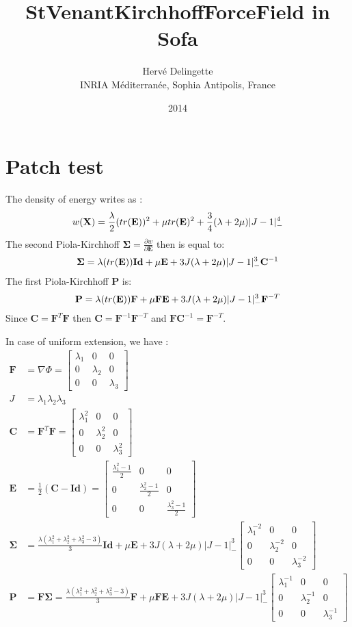 \documentclass[a4paper,11pt]{article}
\title{StVenantKirchhoffForceField in Sofa}
\date{2014}
\author{Herv\'e Delingette\\ {\small INRIA M\'editerran\'ee, Sophia Antipolis, France}}
\newcommand{\pos}{{\mathbf X}}
\newcommand{\strain}{{\mathbf E}}
\newcommand{\rcgd}{{\mathbf C}}
\newcommand{\spk}{{\mathbf \Sigma}}
\newcommand{\fpk}{{\mathbf P}}
\newcommand{\defGrad}{{\mathbf F}}
\newcommand{\identity}{\mathbf{Id}}
\begin{document}
 
\maketitle

\section{Patch test}

The density of energy writes as :
\[
 w(\pos)=\frac{\lambda}{2} (\trace \strain)^2 + \mu \trace \strain^2 +\frac{3}{4}(\lambda+2\mu)|J-1|^4_{-}
\]
The second Piola-Kirchhoff $\spk=\frac{\partial w}{\partial \strain}$ then is equal to:
\[
\spk=\lambda (\trace \strain) \identity + \mu \strain +3 J(\lambda+2\mu) |J-1|^3_{-} \rcgd^{-1}
\]
The first  Piola-Kirchhoff $\fpk$ is:
\[
\fpk= \lambda (\trace \strain) \defGrad + \mu \defGrad \strain +3 J(\lambda+2\mu) |J-1|^3_{-} \defGrad^{-T}
\]
Since $\rcgd=\defGrad^T \defGrad$ then $\rcgd=\defGrad^{-1} \defGrad^{-T}$ and $\defGrad \rcgd^{-1}=\defGrad^{-T}$.

In case of uniform extension, we have :
\begin{align*}
\defGrad &=\nabla \Phi=\left [ \begin{array}{ccc} \lambda_1 & 0 & 0 \\0 & \lambda_2 & 0 \\ 0 & 0 & \lambda_3 \end{array} \right ] \\
J &= \lambda_1 \lambda_2 \lambda_3\\
\rcgd &=  \defGrad^T \defGrad = \left [ \begin{array}{ccc} \lambda_1^2 & 0 & 0 \\0 & \lambda_2^2 & 0 \\ 0 & 0 & \lambda_3^2 \end{array} \right ] \\
\strain &= \frac{1}{2}(\rcgd-\identity) = \left [ \begin{array}{ccc} \frac{\lambda_1^2-1}{2} & 0 & 0 \\0 & \frac{\lambda_2^2-1}{2} & 0 \\ 0 & 0 & \frac{\lambda_3^2-1}{2} \end{array} \right ] \\
\spk&=\frac{\lambda (\lambda_1^2+\lambda_2^2+\lambda_3^2-3)}{3} \identity + \mu \strain +3 J(\lambda+2\mu) |J-1|^3_{-}\left [ \begin{array}{ccc} \lambda_1^{-2} & 0 & 0 \\0 & \lambda_2^{-2} & 0 \\ 0 & 0 & \lambda_3^{-2} \end{array} \right ] \\
\fpk&= \defGrad \spk= \frac{\lambda (\lambda_1^2+\lambda_2^2+\lambda_3^2-3)}{3} \defGrad + \mu \defGrad \strain +3 J(\lambda+2\mu) |J-1|^3_{-}\left [ \begin{array}{ccc} \lambda_1^{-1} & 0 & 0 \\0 & \lambda_2^{-1} & 0 \\ 0 & 0 & \lambda_3^{-1} \end{array} \right ] 
\end{align*}
\end{document}
